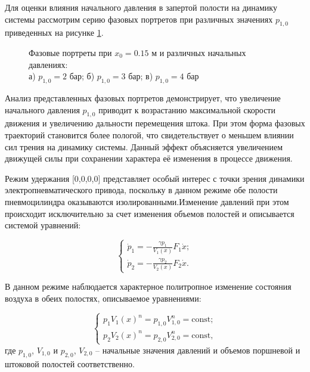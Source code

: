 Для оценки влияния начального давления в запертой полости на динамику системы рассмотрим
серию фазовых портретов при различных значениях $p_{1,0}$ приведенных на рисунке \ref{fig:pp_weak_pressure_matrix}.

\begin{figure}[htbp]
	\caption{Фазовые портреты при $x_0 = \num{0.15}$ м и различных начальных давлениях:\\
		а) $p_{1,0} = 2$ бар; б) $p_{1,0} = 3$ бар; в) $p_{1,0} = 4$ бар}
	\label{fig:pp_weak_pressure_matrix}
\end{figure}

Анализ представленных фазовых портретов демонстрирует, что увеличение начального давления $p_{1,0}$ приводит
к возрастанию максимальной скорости движения и увеличению дальности перемещения штока. При этом форма
фазовых траекторий становится более пологой, что свидетельствует о меньшем влиянии сил трения
на динамику системы. Данный эффект объясняется увеличением движущей силы при сохранении характера
её изменения в процессе движения.


Режим удержания [0,0,0,0] представляет особый интерес с точки зрения
динамики электропневматического привода, поскольку в данном режиме обе полости
пневмоцилиндра оказываются изолированными.Изменение давлений при этом
происходит исключительно за счет изменения объемов полостей и описывается системой уравнений:

$$\begin{cases}
		\dot{p}_1 = -\frac{\gamma p_1}{V_1(x)}F_1\dot{x}; \\
		\dot{p}_2 = -\frac{\gamma p_2}{V_2(x)}F_2\dot{x}.
	\end{cases}$$


В данном режиме наблюдается характерное
политропное изменение состояния воздуха в обеих полостях, описываемое уравнениями:

\begin{equation}
	\begin{cases}
		p_1V_1(x)^n = p_{1,0}V_{1,0}^n = \text{const}; \\
		p_2V_2(x)^n = p_{2,0}V_{2,0}^n = \text{const},
	\end{cases}
\end{equation}
где $p_{1,0}$, $V_{1,0}$ и $p_{2,0}$, $V_{2,0}$ -- начальные значения давлений и объемов поршневой и штоковой полостей соответственно.

